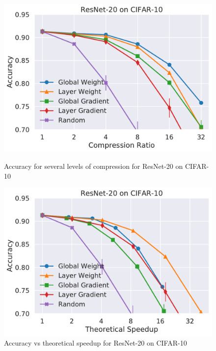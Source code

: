 \begin{figure}
\begin{minipage}[b]{.45\textwidth}
\centering
\includegraphics[width=\linewidth]{shrinkbench/resnet20_CIFAR10_comp}
\caption{Accuracy for several levels of compression for ResNet-20 on CIFAR-10}
\end{minipage}
\hfill
\begin{minipage}[b]{.45\textwidth}
\centering
\includegraphics[width=\linewidth]{shrinkbench/resnet20_CIFAR10_flops}
\caption{Accuracy vs theoretical speedup for ResNet-20 on CIFAR-10}
\end{minipage}
\end{figure}

